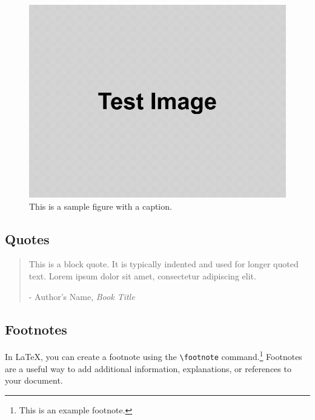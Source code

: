 \documentclass{article}
\begin{document}
\begin{figure}[ht]
  \centering
  \includegraphics[width=0.6\linewidth]{Tutorial1-example1.png} %
  \caption{This is a sample figure with a caption.}
  \label{fig:sample}
\end{figure}

\subsection{Quotes}

\begin{quote}
This is a block quote. It is typically indented and used for longer quoted text. Lorem ipsum dolor sit amet, consectetur adipiscing elit.
\begin{flushright}
- Author's Name, \textit{Book Title}
\end{flushright}
\end{quote}

\subsection{Footnotes}
 In LaTeX, you can create a footnote using the \texttt{\textbackslash footnote} command.\footnote{This is an example footnote.} Footnotes are a useful way to add additional information, explanations, or references to your document.


\vspace*{\fill}
\hrulefill
\vspace*{\fill}

\newpage 

\tableofcontents
{}

\listoftables
\listoffigures
\end{document}
